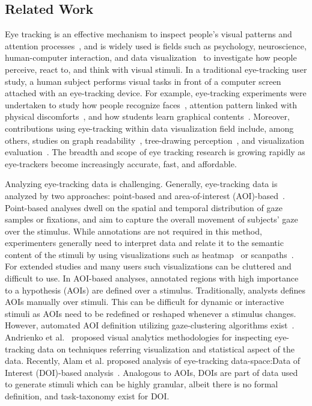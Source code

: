 \subsection{Related Work}
Eye tracking is an effective mechanism to inspect people's visual patterns and attention processes~\cite{jacob1991use}, and is widely used is fields such as psychology, neuroscience, human-computer interaction, and data visualization~\cite{duchowski2002breadth} to investigate how people perceive, react to, and think with visual stimuli. In a traditional eye-tracking user study, a human subject performs visual tasks in front of a computer screen attached with an eye-tracking device. For example, eye-tracking experiments were undertaken to study how people recognize faces~\cite{guo2014perceiving}, attention pattern linked with physical discomforts~\cite{vervoort2013attentional}, and how students learn graphical contents~\cite{mayer2010unique}. Moreover, contributions using eye-tracking within data visualization field include, among others, studies on graph readability~\cite{pohl2009comparing, huang2008beyond, huang2005people}, tree-drawing perception~\cite{burch2011evaluation, burch2013visual}, and visualization evaluation~\cite{kim2012does}.  The breadth and scope of eye tracking research is growing rapidly as eye-trackers become increasingly accurate, fast, and affordable.  

Analyzing eye-tracking data is challenging. Generally, eye-tracking data is analyzed by two approaches: point-based and area-of-interest (AOI)-based~\cite{blascheck2014state}. Point-based analyses dwell on the spatial and temporal distribution of gaze samples or fixations, and aim to capture the overall movement of subjects' gaze over the stimulus.  While  annotations are not required in this method, experimenters generally need to interpret data and relate it to the semantic content of the stimuli by using visualizations such as heatmap~\cite{mackworth1958eye} or scanpaths~\cite{noton1971scanpathsA, noton1971scanpathsB}. For extended studies and many users such visualizations can be cluttered and difficult to use. In AOI-based analyses, annotated regions with high importance to a hypothesis (AOIs) are defined over a stimulus. Traditionally, analysts defines AOIs manually over stimuli. This can be difficult for dynamic or interactive stimuli as AOIs need to be redefined or reshaped whenever a stimulus changes. However, automated AOI definition utilizing gaze-clustering algorithms exist~\cite{privitera2000algorithms}. Andrienko et al.~\cite{andrienko2012visual} proposed visual analytics methodologies for inspecting eye-tracking data on techniques referring visualization and statistical aspect of the data. Recently, Alam et al. proposed analysis of eye-tracking data-space:Data of Interest (DOI)-based analysis~\cite{alamdata}. Analogous to AOIs, DOIs are part of data used to generate stimuli which can be highly granular, albeit there is no formal definition, and task-taxonomy exist for DOI. 

